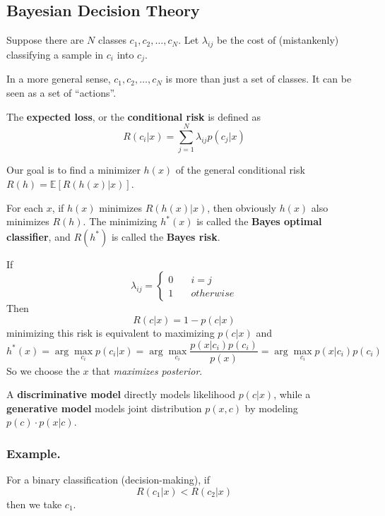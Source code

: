     \subsection{Bayesian Decision Theory}
        Suppose there are $N$ classes $c_1,c_2,\dots,c_N$. Let $\lambda_{ij}$ be the cost of (mistankenly) classifying a sample in $c_i$ into $c_j$.
        \begin{remark}
            In a more general sense, $c_1, c_2, \dots, c_N$ is more than just a set of classes. It can be seen as a set of ``actions''.
        \end{remark}

        \begin{definition}
            The \textbf{expected loss}, or the \textbf{conditional risk} is defined as
            \[ R(c_i|x) = \sum_{j=1}^N \lambda_{ij}p(c_j|x) \]
        \end{definition}
        Our goal is to find a minimizer $h(x)$ of the general conditional risk $R(h) = \mathbb{E}[R(h(x)|x)]$.

        For each $x$, if $h(x)$ minimizes $R(h(x)|x)$, then obviously $h(x)$ also minimizes $R(h)$. The minimizing $h^*(x)$ is called the \textbf{Bayes optimal classifier}, and $R(h^*)$ is called the \textbf{Bayes risk}.

        If
        \[
        \lambda_{ij} = 
        \begin{cases}
            0 \quad & i = j\\
            1 \quad & otherwise
        \end{cases}    
        \]
        Then
        \[ R(c|x) = 1 - p(c|x) \]
        minimizing this risk is equivalent to maximizing $p(c|x)$ and
        \[ h^*(x) = \arg \max_{c_i} p(c_i|x) = \arg \max_{c_i} \frac{p(x|c_i)p(c_i)}{p(x)} = \arg\max_{c_i} p(x|c_i)p(c_i)\]
        So we choose the $x$ that \emph{maximizes posterior}.

        \begin{remark}
            A \textbf{discriminative model} directly models likelihood $p(c|x)$, while a \textbf{generative model} models joint distribution $p(x,c)$ by modeling $p(c) \cdot p(x|c)$.
        \end{remark}

        \subsubsection{Example.}
        For a binary classification (decision-making), if
        \[ R(c_1|x) < R(c_2|x) \]
        then we take $c_1$.

